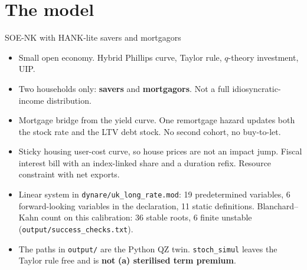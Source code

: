 \documentclass[11pt,aspectratio=169]{beamer}
\begin{document}
\section{The model}
\begin{frame}{SOE-NK with HANK-lite savers and mortgagors}
  \begin{itemize}
    \item Small open economy. Hybrid Phillips curve, Taylor rule,
          $q$-theory investment, UIP.
    \item Two households only: \textbf{savers} and \textbf{mortgagors}.
          Not a full idiosyncratic-income distribution.
    \item Mortgage bridge from the yield curve. One remortgage hazard
          updates both the stock rate and the LTV debt stock.
          No second cohort, no buy-to-let.
    \item Sticky housing user-cost curve, so house prices are not an
          impact jump. Fiscal interest bill with an index-linked share
          and a duration refix. Resource constraint with net exports.
    \item Linear system in \texttt{dynare/uk\_long\_rate.mod}:
          19 predetermined variables, 6 forward-looking variables in
          the declaration, 11 static definitions.
          Blanchard--Kahn count on this calibration: 36 stable roots,
          6 finite unstable (\texttt{output/success\_checks.txt}).
    \item The paths in \texttt{output/} are the Python QZ twin.
          \texttt{stoch\_simul} leaves the Taylor rule free and is
          \textbf{not} \textbf{(a) sterilised term premium}.
  \end{itemize}
\end{frame}
\end{document}

